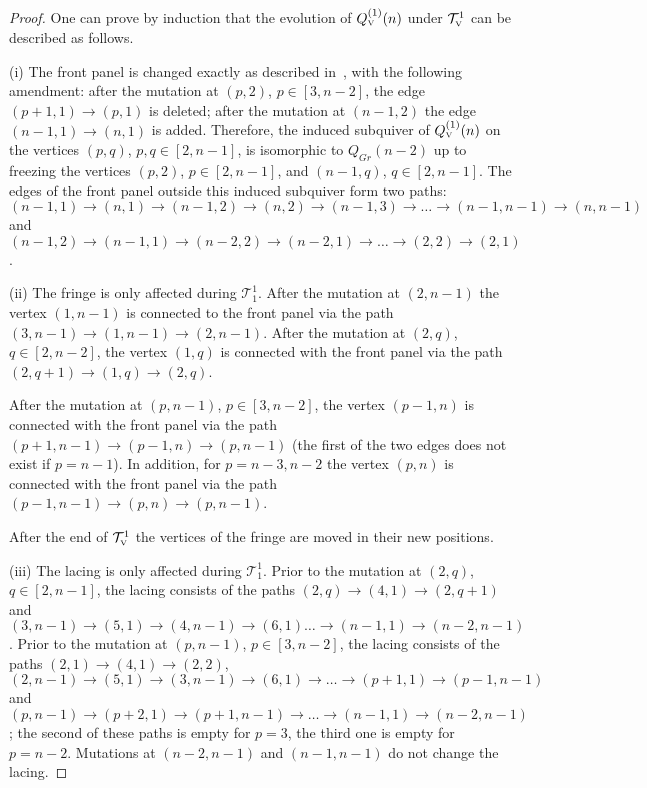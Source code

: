 \documentclass{amsart}
\theoremstyle{definition}
\theoremstyle{remark}
\numberwithin{equation}{section}
\numberwithin{theorem}{section}
\begin{document}
 \begin{proof}
 One can prove by induction that the evolution of $Q^{(1)}_{\mbox{\tiny\rm V}}(n)$ under ${{\mathcal T}}^1_{\mbox{\tiny\rm V}}$
 can be described as follows.
 
 {\rm (i)} The front panel is changed exactly as described in~{\rm \cite[Lemma 4.13]{GSVb}}, with the following amendment: after the 
mutation at $(p,2)$, $p\in[3,n-2]$, the edge $(p+1,1)\to(p,1)$ is deleted; after the mutation at $(n-1,2)$
the edge $(n-1,1)\to(n,1)$ is added. Therefore, the induced subquiver of
$Q^{(1)}_{\mbox{\tiny\rm V}}(n)$ on the vertices $(p,q)$, $p,q\in [2,n-1]$,
is isomorphic to $Q_{Gr}(n-2)$ up to freezing the vertices $(p,2)$, $p\in [2,n-1]$,
and $(n-1,q)$, $q\in [2,n-1]$. 
The edges of the front panel outside this induced subquiver form two paths:
$(n-1,1)\to(n,1)\to(n-1,2)\to(n,2)\to(n-1,3)\to\dots\to(n-1,n-1)\to(n,n-1)$ and
$(n-1,2)\to(n-1,1)\to(n-2,2)\to(n-2,1)\to\dots\to(2,2)\to(2,1)$.

{\rm (ii)} The fringe is only affected during ${{\mathcal T}}^1_1$. 
After the mutation at $(2,n-1)$ the vertex
$(1,n-1)$ is connected to the front panel via the path $(3,n-1)\to(1,n-1)\to(2,n-1)$. 
After the mutation at 
$(2,q)$, $q\in [2,n-2]$, the vertex $(1,q)$ is connected with the front panel via the path 
$(2,q+1)\to(1,q)\to(2,q)$.

After the mutation at $(p,n-1)$,
$p\in [3,n-2]$, the vertex $(p-1,n)$ is connected with the front panel via the path
$(p+1,n-1)\to(p-1,n)\to(p,n-1)$ {\rm(}the first of the two edges does not exist if $p=n-1${\rm).} 
In addition, for $p=n-3,n-2$ the vertex $(p,n)$ is connected 
with the front panel via the path $(p-1,n-1)\to(p,n)\to(p,n-1)$. 

After the end of ${{\mathcal T}}^1_{\mbox{\tiny\rm V}}$ the vertices of the fringe are moved in their new positions.

{\rm (iii)} The lacing is only affected during ${{\mathcal T}}_1^1$. 
Prior to the mutation at $(2,q)$, $q\in [2,n-1]$, 
the lacing consists of the paths $(2,q)\to(4,1)\to (2,q+1)$ and
$(3,n-1)\to(5,1)\to(4,n-1)\to(6,1)\dots\to(n-1,1)\to(n-2,n-1)$.
Prior to the mutation at $(p,n-1)$, $p\in [3,n-2]$, the lacing 
consists of the paths $(2,1)\to(4,1)\to(2,2)$, 
$(2,n-1)\to(5,1)\to(3,n-1)\to(6,1)\to\dots\to(p+1,1)\to(p-1,n-1)$ and
$(p,n-1)\to(p+2,1)\to(p+1,n-1)\to\dots\to(n-1,1)\to(n-2,n-1)$; the second of these paths is empty for $p=3$,
the third one is empty for $p=n-2$. Mutations at $(n-2,n-1)$ and $(n-1,n-1)$ do not change the lacing.
\end{proof}
\end{document}
